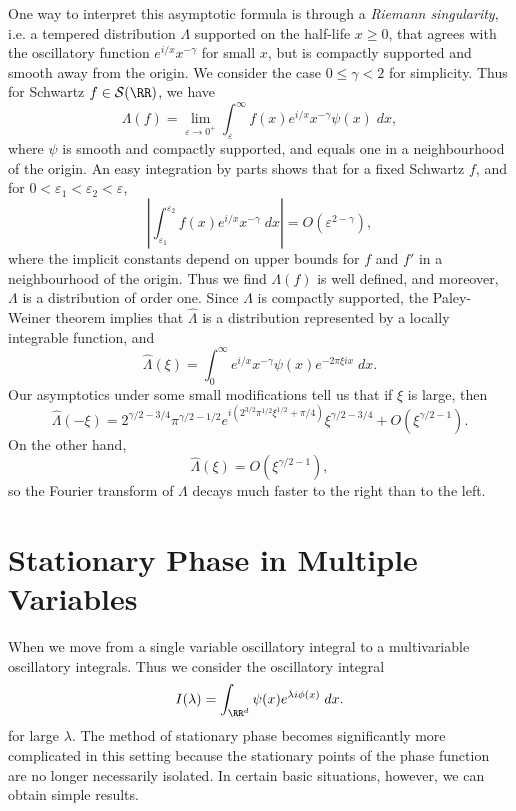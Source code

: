 \begin{example}
  One way to interpret this asymptotic formula is through a \emph{Riemann singularity}, i.e. a tempered distribution $\Lambda$ supported on the half-life $x \geq 0$, that agrees with the oscillatory function $e^{i/x} x^{-\gamma}$ for small $x$, but is compactly supported and smooth away from the origin. We consider the case $0 \leq \gamma < 2$ for simplicity. Thus for Schwartz $f \in \mathcal{S}(\RR)$, we have
  \[ \Lambda(f) = \lim_{\varepsilon \to 0^+} \int_\varepsilon^\infty f(x) e^{i/x} x^{-\gamma} \psi(x)\; dx, \]
  where $\psi$ is smooth and compactly supported, and equals one in a neighbourhood of the origin. An easy integration by parts shows that for a fixed Schwartz $f$, and for $0 < \varepsilon_1 < \varepsilon_2 < \varepsilon$,
  \[ \left| \int_{\varepsilon_1}^{\varepsilon_2} f(x) e^{i/x} x^{-\gamma}\; dx \right| = O\left(\varepsilon^{2-\gamma} \right), \]
  where the implicit constants depend on upper bounds for $f$ and $f'$ in a neighbourhood of the origin. Thus we find $\Lambda(f)$ is well defined, and moreover, $\Lambda$ is a distribution of order one. Since $\Lambda$ is compactly supported, the Paley-Weiner theorem implies that $\widehat{\Lambda}$ is a distribution represented by a locally integrable function, and
  \[ \widehat{\Lambda}(\xi) = \int_0^\infty e^{i/x} x^{-\gamma} \psi(x) e^{-2 \pi \xi i x}\; dx. \]
  Our asymptotics under some small modifications tell us that if $\xi$ is large, then
  \[ \widehat{\Lambda}(-\xi) = 2^{\gamma/2 - 3/4} \pi^{\gamma/2-1/2} e^{i(2^{3/2} \pi^{1/2} \xi^{1/2} + \pi/4)} \xi^{\gamma/2 - 3/4} + O(\xi^{\gamma/2 - 1}). \]
  On the other hand,
  \[ \widehat{\Lambda}(\xi) = O(\xi^{\gamma/2 - 1}), \]
  so the Fourier transform of $\Lambda$ decays much faster to the right than to the left.
\end{example}

\section{Stationary Phase in Multiple Variables}

When we move from a single variable oscillatory integral to a multivariable oscillatory integrals. Thus we consider the oscillatory integral
%
\[ I(\lambda) = \int_{\RR^d} \psi(x) e^{\lambda i \phi(x)}\; dx. \]
%
for large $\lambda$. The method of stationary phase becomes significantly more complicated in this setting because the stationary points of the phase function are no longer necessarily isolated. In certain basic situations, however, we can obtain simple results.

